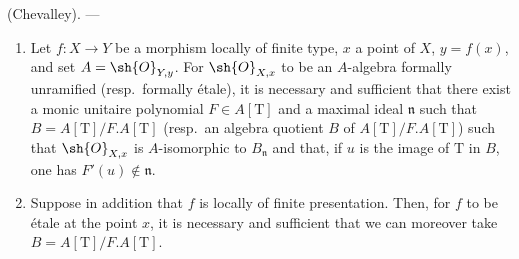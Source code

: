\begin{theorem}[18.4.6]
\label{IV.18.4.6}
(Chevalley). ---
\begin{enumerate}
  \item[(i)] Let $f:X\to Y$ be a morphism locally of finite type, $x$ a point of $X$, $y=f(x)$, and set $A=\sh{O}_{Y,y}$.
For $\sh{O}_{X,x}$ to be an $A$-algebra formally unramified (resp.\ formally \'etale), it is necessary and sufficient that there exist a monic unitaire polynomial $F\in A[\mathrm{T}]$ and a maximal ideal $\mathfrak{n}$ such that $B=A[\mathrm{T}]/F.A[\mathrm{T}]$ (resp.\ an algebra quotient $B$ of $A[\mathrm{T}]/F.A[\mathrm{T}]$) such that $\sh{O}_{X,x}$ is $A$-isomorphic to $B_\mathfrak{n}$ and that, if $u$ is the image of $\mathrm{T}$ in $B$, one has $F'(u)\notin\mathfrak{n}$.
  \item[(ii)] Suppose in addition that $f$ is locally of finite presentation.
Then, for $f$ to be \'etale at the point $x$, it is necessary and sufficient that we can moreover take $B=A[\mathrm{T}]/F.A[\mathrm{T}]$.
\end{enumerate}
\end{theorem}

